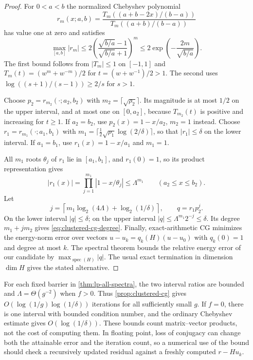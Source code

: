 \begin{proof}
For $0<a<b$ the normalized Chebyshev polynomial
\[
 r_m(x;a,b)=
 \frac{T_m((a+b-2x)/(b-a))}{T_m((a+b)/(b-a))}
\]
has value one at zero and satisfies
\begin{equation}
 \max_{[a,b]}|r_m|\leq
 2\left(\frac{\sqrt{b/a}-1}{\sqrt{b/a}+1}\right)^m
 \leq2\exp\left(-\frac{2m}{\sqrt{b/a}}\right).
 \label{eq:chebyshev-bound}
\end{equation}
The first bound follows from $|T_m|\leq1$ on $[-1,1]$ and
$T_m(t)=(w^m+w^{-m})/2$ for
$t=(w+w^{-1})/2>1$. The second uses
$\log((s+1)/(s-1))\geq2/s$ for $s>1$.

Choose $p_2=r_{m_2}(\cdot;a_2,b_2)$ with
$m_2=\lceil\sqrt{\rho_2}\rceil$. Its magnitude is at most $1/2$
on the upper interval, and at most one on $[0,a_2]$, because
$T_{m_2}(t)$ is positive and increasing for $t\geq1$. If
$a_2=b_2$, use $p_2(x)=1-x/a_2$, $m_2=1$ instead.
Choose $r_1=r_{m_1}(\cdot;a_1,b_1)$ with
$m_1=\lceil\tfrac12\sqrt{\rho_1}\log(2/\delta)\rceil$,
so that $|r_1|\leq\delta$ on the lower interval. If $a_1=b_1$,
use $r_1(x)=1-x/a_1$ and $m_1=1$.

All $m_1$ roots $\theta_j$ of $r_1$ lie in $[a_1,b_1]$, and
$r_1(0)=1$, so its product representation gives
\[
 |r_1(x)|=\prod_{j=1}^{m_1}|1-x/\theta_j|
 \leq\Lambda^{m_1}\qquad(a_2\leq x\leq b_2).
\]
Let
\[
 j=\left\lceil m_1\log_2(4\Lambda)+\log_2(1/\delta)\right\rceil,
 \qquad q=r_1p_2^j.
\]
On the lower interval $|q|\leq\delta$; on the upper interval
$|q|\leq\Lambda^{m_1}2^{-j}\leq\delta$. Its degree
$m_1+jm_2$ gives \eqref{eq:clustered-cg-degree}.
Finally, exact-arithmetic CG minimizes the energy-norm error over
vectors $u-u_k=q_k(H)(u-u_0)$ with $q_k(0)=1$ and degree at most
$k$. The spectral theorem bounds the relative energy error of our
candidate by $\max_{\operatorname{spec}(H)}|q|$. The usual exact
termination in dimension $\dim H$ gives the stated alternative.
\end{proof}

For each fixed barrier in \cref{thm:lp-all-spectra}, the two interval
ratios are bounded and $\Lambda=\Theta(g^{-2})$ when $f>0$.
Thus \cref{prop:clustered-cg} gives
$O(\log(1/g)\log(1/\delta))$ iterations for all sufficiently small
$g$. If $f=0$, there is one interval with bounded condition number,
and the ordinary Chebyshev estimate gives $O(\log(1/\delta))$.
These bounds count matrix--vector products, not the cost of computing
them. In floating point, loss of conjugacy can change both the
attainable error and the iteration count, so a numerical use of the
bound should check a recursively updated residual against a freshly
computed $r-Hu_k$.

